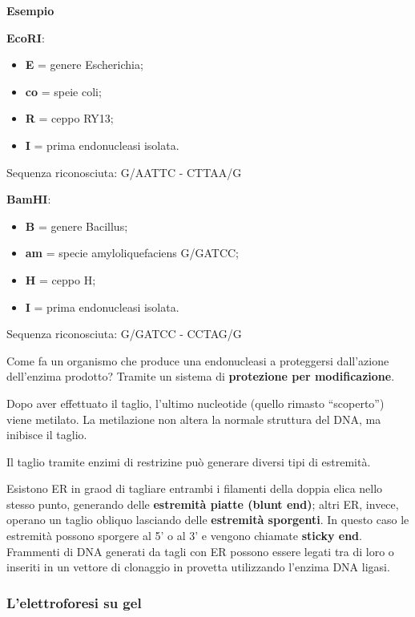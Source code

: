 \documentclass[]{article}
\begin{document}
\textbf{Esempio}

\textbf{EcoRI}:

\begin{itemize}
\itemsep1pt\parskip0pt
\item
  \textbf{E} = genere Escherichia;
\item
  \textbf{co} = speie coli;
\item
  \textbf{R} = ceppo RY13;
\item
  \textbf{I} = prima endonucleasi isolata.
\end{itemize}

Sequenza riconosciuta: G/AATTC - CTTAA/G

\textbf{BamHI}:

\begin{itemize}
\itemsep1pt\parskip0pt
\item
  \textbf{B} = genere Bacillus;
\item
  \textbf{am} = specie amyloliquefaciens G/GATCC;
\item
  \textbf{H} = ceppo H;
\item
  \textbf{I} = prima endonucleasi isolata.
\end{itemize}

Sequenza riconosciuta: G/GATCC - CCTAG/G

Come fa un organismo che produce una endonucleasi a proteggersi
dall'azione dell'enzima prodotto? Tramite un sistema di
\textbf{protezione per modificazione}.

Dopo aver effettuato il taglio, l'ultimo nucleotide (quello rimasto
``scoperto'') viene metilato. La metilazione non altera la normale
struttura del DNA, ma inibisce il taglio.

Il taglio tramite enzimi di restrizine può generare diversi tipi di
estremità.

Esistono ER in graod di tagliare entrambi i filamenti della doppia elica
nello stesso punto, generando delle \textbf{estremità piatte (blunt
end)}; altri ER, invece, operano un taglio obliquo lasciando delle
\textbf{estremità sporgenti}. In questo caso le estremità possono
sporgere al 5' o al 3' e vengono chiamate \textbf{sticky end}. Frammenti
di DNA generati da tagli con ER possono essere legati tra di loro o
inseriti in un vettore di clonaggio in provetta utilizzando l'enzima DNA
ligasi.

\subsubsection{L'elettroforesi su gel}\label{lelettroforesi-su-gel}
\end{document}
